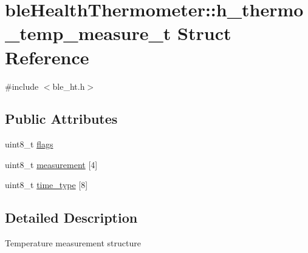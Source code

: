\hypertarget{structble_health_thermometer_1_1h__thermo__temp__measure__t}{\section{ble\-Health\-Thermometer\-:\-:h\-\_\-thermo\-\_\-temp\-\_\-measure\-\_\-t Struct Reference}
\label{structble_health_thermometer_1_1h__thermo__temp__measure__t}
}


{\ttfamily \#include $<$ble\-\_\-ht.\-h$>$}

\subsection*{Public Attributes}
\begin{DoxyCompactItemize}
\item 
uint8\-\_\-t \hyperlink{structble_health_thermometer_1_1h__thermo__temp__measure__t_ad2beee2a9d16609e0171df720eea4fc4}{flags}
\item 
uint8\-\_\-t \hyperlink{structble_health_thermometer_1_1h__thermo__temp__measure__t_ae65911e1474d1271d982d70b2624609f}{measurement} \mbox{[}4\mbox{]}
\item 
uint8\-\_\-t \hyperlink{structble_health_thermometer_1_1h__thermo__temp__measure__t_a5827f7c41051575943c0b7c85a20ef72}{time\-\_\-type} \mbox{[}8\mbox{]}
\end{DoxyCompactItemize}


\subsection{Detailed Description}
Temperature measurement structure 


